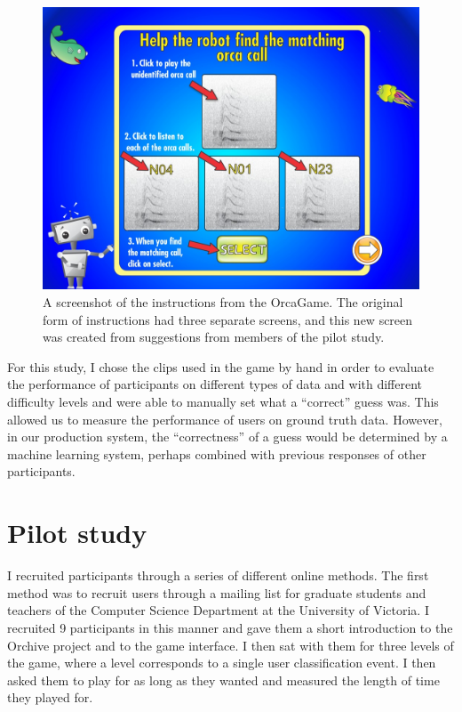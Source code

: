 \begin{figure}[h]
\centering
\includegraphics[width=\columnwidth]{figures/orcagameInstructions}
\caption{A screenshot of the instructions from the OrcaGame.  The
  original form of instructions had three separate screens, and this
  new screen was created from suggestions from members of the pilot
  study. }
\label{fig:OrcaGameInstructions}
\end{figure}

For this study, I chose the clips used in the game by hand in order
to evaluate the performance of participants on different types of data
and with different difficulty levels and were able to manually set
what a ``correct'' guess was.  This allowed us to measure the
performance of users on ground truth data.  However, in our production
system, the ``correctness'' of a guess would be determined by a
machine learning system, perhaps combined with previous responses of
other participants.

\section{Pilot study}

I recruited participants through a series of different online
methods.  The first method was to recruit users through a mailing list
for graduate students and teachers of the Computer Science Department
at the University of Victoria.  I recruited 9 participants in this
manner and gave them a short introduction to the Orchive project and
to the game interface.  I then sat with them for three levels of the
game, where a level corresponds to a single user classification event.
I then asked them to play for as long as they wanted and measured
the length of time they played for.

